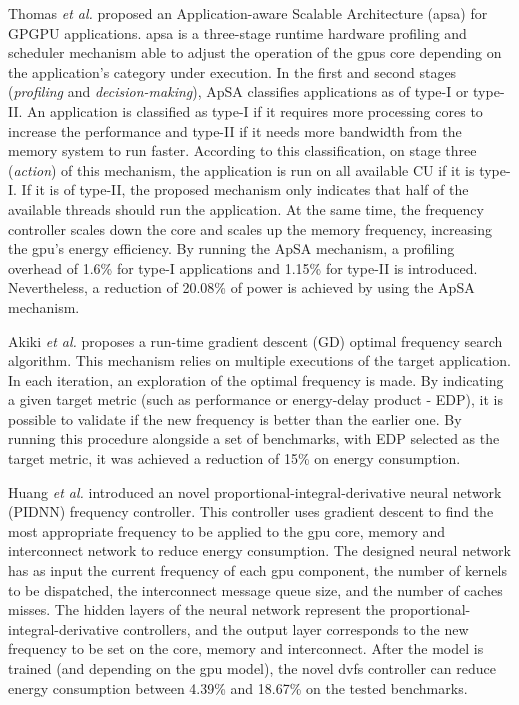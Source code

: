 Thomas \textit{et al.} \cite{thomas_application_2018} proposed an Application-aware Scalable Architecture (\acrshort{apsa}) for GPGPU applications. \acrshort{apsa} is a three-stage runtime hardware profiling and scheduler mechanism able to adjust the operation of the \acrshort{gpu}s core depending on the application's category under execution. In the first and second stages (\textit{profiling} and \textit{decision-making}), ApSA classifies applications as of type-I or type-II. An application is classified as type-I if it requires more processing cores to increase the performance and type-II if it needs more bandwidth from the memory system to run faster. According to this classification, on stage three (\textit{action}) of this mechanism, the application is run on all available CU if it is type-I. If it is of type-II, the proposed mechanism only indicates that half of the available threads should run the application. At the same time, the frequency controller scales down the core and scales up the memory frequency, increasing the \acrshort{gpu}'s energy efficiency. By running the ApSA mechanism, a profiling overhead of 1.6\% for type-I applications and 1.15\% for type-II is introduced. Nevertheless, a reduction of 20.08\% of power is achieved by using the ApSA mechanism.




Akiki \textit{et al.} \cite{akiki_energy-aware_2018} proposes a run-time gradient descent (GD) optimal frequency search algorithm. This mechanism relies on multiple executions of the target application. In each iteration, an exploration of the optimal frequency is made. By indicating a given target metric (such as performance or energy-delay product - EDP), it is possible to validate if the new frequency is better than the earlier one. By running this procedure alongside a set of benchmarks, with EDP selected as the target metric, it was achieved a reduction of 15\% on energy consumption.

Huang \textit{et al.} \cite{huang_gpu_2019} introduced an novel proportional-integral-derivative neural network (PIDNN) frequency controller. This controller uses gradient descent to find the most appropriate frequency to be applied to the \acrshort{gpu} core, memory and interconnect network to reduce energy consumption. The designed neural network has as input the current frequency of each \acrshort{gpu} component, the number of kernels to be dispatched, the interconnect message queue size, and the number of caches misses. The hidden layers of the neural network represent the proportional-integral-derivative controllers, and the output layer corresponds to the new frequency to be set on the core, memory and interconnect. After the model is trained (and depending on the \acrshort{gpu} model), the novel \acrshort{dvfs} controller can reduce energy consumption between 4.39\% and 18.67\% on the tested benchmarks.




